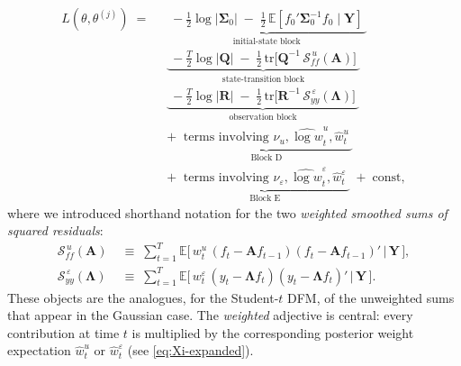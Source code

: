 \documentclass[11pt, a4paper, oneside]{article}
\newcommand{\mY}{\mathbf{Y}}
\newcommand{\mL}{\boldsymbol{\Lambda}}
\newcommand{\mA}{\mathbf{A}}
\newcommand{\mR}{\mathbf{R}}
\newcommand{\mQ}{\mathbf{Q}}
\begin{document}
\begin{equation}
\begin{aligned}
L(\theta, \theta^{(j)}) \;=\;\;
& \underbrace{\phantom{\big|} -\tfrac{1}{2}\log|\boldsymbol{\Sigma}_0| \;-\; \tfrac{1}{2}\,\mathbb{E}[f_0'\boldsymbol{\Sigma}_0^{-1} f_0 \mid \mY] \phantom{\big|}}_{\text{initial-state block}} \\[3pt]
& \underbrace{\phantom{\big|} -\tfrac{T}{2}\log|\mQ|
  \;-\; \tfrac{1}{2}\,\mathrm{tr}\!\Big[\mQ^{-1}\, \mathcal{S}_{ff}^{\,u}(\mA)\Big] \phantom{\big|}}_{\text{state-transition block}} \\[3pt]
& \underbrace{\phantom{\big|} -\tfrac{T}{2}\log|\mR|
  \;-\; \tfrac{1}{2}\,\mathrm{tr}\!\Big[\mR^{-1}\, \mathcal{S}_{yy}^{\,\varepsilon}(\mL)\Big] \phantom{\big|}}_{\text{observation block}} \\[3pt]
& + \;\underbrace{\phantom{\big|} \text{terms involving } \nu_u, \widehat{\log w}^u_t, \hat{w}^u_t \phantom{\big|}}_{\text{Block D}} \\[3pt]
& + \;\underbrace{\phantom{\big|} \text{terms involving } \nu_\varepsilon, \widehat{\log w}^\varepsilon_t, \hat{w}^\varepsilon_t \phantom{\big|}}_{\text{Block E}} \;+\; \text{const},
\end{aligned}
\label{eq:Q-function-expanded}
\end{equation}
where we introduced shorthand notation for the two \emph{weighted
smoothed sums of squared residuals}:
\begin{align}
\mathcal{S}_{ff}^{\,u}(\mA)
&\;\equiv\; \sum_{t=1}^{T} \mathbb{E}\!\big[\,w^u_t\, (f_t - \mA f_{t-1})(f_t - \mA f_{t-1})' \,\big|\, \mY\,\big],
\label{eq:Sff-def} \\[4pt]
\mathcal{S}_{yy}^{\,\varepsilon}(\mL)
&\;\equiv\; \sum_{t=1}^{T} \mathbb{E}\!\big[\,w^\varepsilon_t\, (y_t - \mL f_t)(y_t - \mL f_t)' \,\big|\, \mY\,\big].
\label{eq:Syy-def}
\end{align}
These objects are the analogues, for the Student-$t$ DFM, of the
unweighted sums that appear in the Gaussian case. The \emph{weighted}
adjective is central: every contribution at time $t$ is multiplied by
the corresponding posterior weight expectation $\hat{w}^u_t$ or
$\hat{w}^\varepsilon_t$ (see \eqref{eq:Xi-expanded}).
\end{document}
